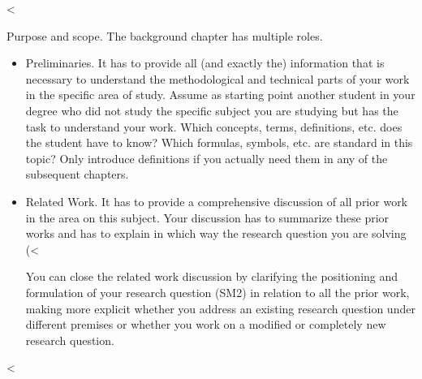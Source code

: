 \documentclass[runningheads,a4paper,english]{llncs}[2018/03/10]
\begin{document}
{%
<%

\textsf{Purpose and scope}. The background chapter has multiple roles.
\begin{itemize}

    \item \textsf{Preliminaries.} It has to provide all (and exactly the) information that is necessary to understand the methodological and technical parts of your work in the specific area of study. Assume as starting point another student in your degree who did not study the specific subject you are studying but has the task to understand your work. Which concepts, terms, definitions, etc. does the student have to know? Which formulas, symbols, etc. are standard in this topic? Only introduce definitions if you actually need them in any of the subsequent chapters.
    
    \item \textsf{Related Work.} It has to provide a comprehensive discussion of all prior work in the area on this subject. Your discussion has to summarize these prior works and has to explain in which way the research question you are solving (<%
    
    You can close the related work discussion by clarifying the positioning and formulation of your research question (SM2) in relation to all the prior work, making more explicit whether you address an existing research question under different premises or whether you work on a modified or completely new research question.
\end{itemize}

<%

}
\end{document}
